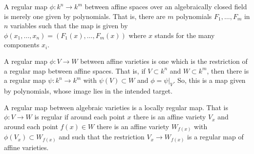 \documentclass{article}
\begin{document}
A regular map $\phi : k^n\to k^m$ between affine spaces over an algebraically closed field is merely one given by polynomials.  That is, there are $m$ polynomials $F_1, \ldots, F_m$ in $n$ variables such that the map is given by $\phi(x_1, \ldots, x_n) = (F_1(x),\ldots, F_m(x))$ where $x$ stands for the many components $x_i$.

A regular map $\phi : V\to W$ between affine varieties is one which is the restriction of a regular map between affine spaces.  That is, if $V\subset k^n$ and $W\subset k^m$, then there is a regular map $\psi : k^n\to k^m$ with $\psi(V)\subset W$ and $\phi = \psi|_V$.  So, this is a map given by polynomials, whose image lies in the intended target.

A regular map between algebraic varieties is a locally regular map.  That is $\phi  : V\to W$ is regular if around each point $x$ there is an affine variety $V_x$ and around each point $f(x)\in W$ there is an affine variety $W_{f(x)}$ with $\phi(V_x)\subset W_{f(x)}$ and such that the restriction $V_x \to W_{f(x)}$ is a regular map of affine varieties.
\end{document}
